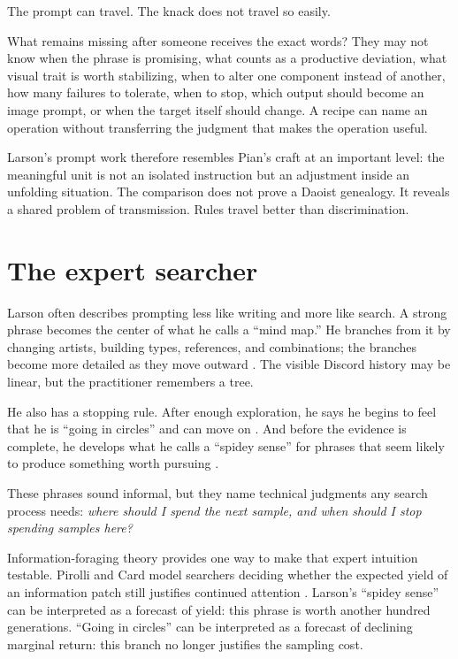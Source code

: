 \documentclass[11pt]{article}
\begin{document}
The prompt can travel. The knack does not travel so easily.

What remains missing after someone receives the exact words? They may not know when the phrase is promising, what counts as a productive deviation, what visual trait is worth stabilizing, when to alter one component instead of another, how many failures to tolerate, when to stop, which output should become an image prompt, or when the target itself should change. A recipe can name an operation without transferring the judgment that makes the operation useful.

Larson's prompt work therefore resembles Pian's craft at an important level: the meaningful unit is not an isolated instruction but an adjustment inside an unfolding situation. The comparison does not prove a Daoist genealogy. It reveals a shared problem of transmission. Rules travel better than discrimination.

\section{The expert searcher}
Larson often describes prompting less like writing and more like search. A strong phrase becomes the center of what he calls a ``mind map.'' He branches from it by changing artists, building types, references, and combinations; the branches become more detailed as they move outward \cite{Larson2022}. The visible Discord history may be linear, but the practitioner remembers a tree.

He also has a stopping rule. After enough exploration, he says he begins to feel that he is ``going in circles'' and can move on \cite{Larson2022}. And before the evidence is complete, he develops what he calls a ``spidey sense'' for phrases that seem likely to produce something worth pursuing \cite{Larson2022}.

These phrases sound informal, but they name technical judgments any search process needs: \emph{where should I spend the next sample, and when should I stop spending samples here?}

Information-foraging theory provides one way to make that expert intuition testable. Pirolli and Card model searchers deciding whether the expected yield of an information patch still justifies continued attention \cite{PirolliCard1999}. Larson's ``spidey sense'' can be interpreted as a forecast of yield: this phrase is worth another hundred generations. ``Going in circles'' can be interpreted as a forecast of declining marginal return: this branch no longer justifies the sampling cost.
\end{document}
